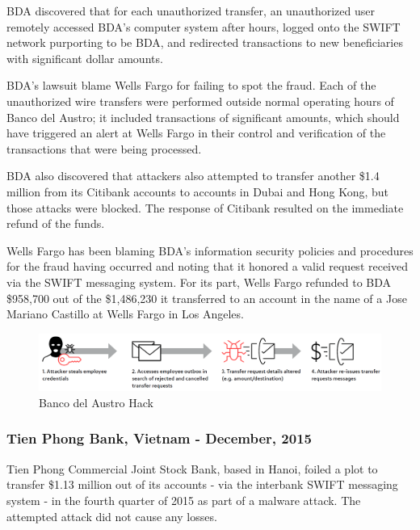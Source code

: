 \documentclass[12pt]{article}
\begin{document}
        BDA discovered that for each unauthorized transfer, an unauthorized user remotely accessed BDA's computer system after hours, logged onto the SWIFT network purporting to be BDA, and redirected transactions to new beneficiaries with significant dollar amounts. 

        BDA's lawsuit blame Wells Fargo for failing to spot the fraud. Each of the unauthorized wire transfers were performed outside normal operating hours of Banco del Austro; it included transactions of significant amounts, which should have triggered an alert at Wells Fargo in their control and verification of the transactions that were being processed.

        BDA also discovered that attackers also attempted to transfer another \$1.4 million from its Citibank accounts to accounts in Dubai and Hong Kong, but those attacks were blocked. The response of Citibank resulted on the immediate refund of the funds.

        Wells Fargo has been blaming BDA's information security policies and procedures for the fraud having occurred and noting that it honored a valid request received via the SWIFT messaging system. For its part, Wells Fargo refunded to BDA \$958,700 out of the \$1,486,230 it transferred to an account in the name of a Jose Mariano Castillo at Wells Fargo in Los Angeles.\cite{AnotherSWIFTHack}\cite{EcuadorBankHacked}\cite{ExclusiveEcuadorCyber2016}\cite{SpecialReportCyber2016}
        
        \begin{figure}[H]
        \centering
        \includegraphics[width=\textwidth]{figures/austro.png}
        \caption{Banco del Austro Hack}
        \label{fig:AustroHacks}
        \end{figure}
        
    \subsubsection{Tien Phong Bank, Vietnam - December, 2015}
    
        Tien Phong Commercial Joint Stock Bank, based in Hanoi, foiled a plot to transfer \$1.13 million out of its accounts - via the interbank SWIFT messaging system - in the fourth quarter of 2015 as part of a malware attack. The attempted attack did not cause any losses. 
        
\end{document}
